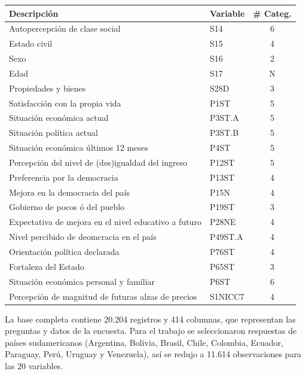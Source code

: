 \documentclass[]{article}
\begin{document}
\begin{center}
	\begin{tabular}{|l|l|c|}\hline
		Descripción & Variable & \# Categ.\\ \hline
		Autopercepción de clase social & S14 & 6\\
		Estado civil & S15 & 4\\
		Sexo & S16 & 2\\
		Edad & S17 & N\\
		Propiedades y bienes & S28D & 3\\
		Satisfacción con la propia vida & P1ST & 5\\
		Situación económica actual & P3ST.A & 5\\
		Situación política actual & P3ST.B & 5\\
		Situación económica últimos 12 meses & P4ST & 5\\
		Percepción del nivel de (des)igualdad del ingreso & P12ST & 5\\
		Preferencia por la democracia & P13ST & 4\\
		Mejora en la democracia del país & P15N & 4\\
		Gobierno de pocos ó del pueblo & P19ST & 3\\
		Expectativa de mejora en el nivel educativo a futuro & P28NE & 4\\
		Nivel percibido de deomcracia en el país & P49ST.A & 4\\
		Orientación política declarada & P76ST & 4\\
		Fortaleza del Estado & P65ST & 3\\
		Situación económica personal y familiar & P6ST & 6\\
		Percepción de magnitud de futuras alzas de precios & S1NICC7 & 4\\ \hline
	\end{tabular}
\end{center}


La base completa contiene 20.204 registros y 414 columnas, que representan las preguntas y datos de la encuesta. Para el trabajo se seleccionaron respuestas de países sudamericanos (Argentina, Bolivia, Brasil, Chile, Colombia, Ecuador, Paraguay, Perú, Uruguay y Venezuela), así se redujo a 11.614 observaciones para las 20 variables. 
\end{document}
